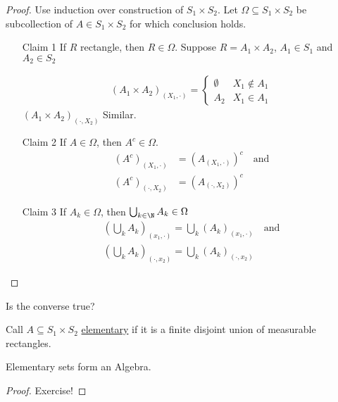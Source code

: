 \begin{proof}
	Use induction over construction of $S_1 \times S_2$.
	Let $\Omega \subseteq S_1 \times S_2$ be subcollection of $A \in S_1 \times S_2$ for which conclusion holds.

	 \begin{enumerate}
		 \item[Claim 1] If $R$ rectangle, then $R \in \Omega$. Suppose  $R = A_1 \times A_2$, $A_1 \in S_1$ and $A_2 \in S_2$

			 \begin{align*}
				 (A_1 \times A_2)_{(X_1, \cdot)} =
				 \begin{cases}
					 \emptyset & X_1 \notin A_1 \\
					 A_2 & X_1 \in A_1
				 \end{cases}
			 \end{align*} 
			 $(A_1 \times A_2)_{(\cdot, X_2)}$ Similar.
		 \item[Claim 2] If $A \in \Omega$, then  $A^c \in \Omega$.
			 \begin{align*}
				 (A^c)_{(X_1, \cdot)} &= (A_{(X_1, \cdot)})^c \quad \text{and} \\
				 (A^c)_{(\cdot, X_2)} &= (A_{(\cdot, X_2)})^c
			 \end{align*}

		 \item[Claim 3] If $A_k \in \Omega$, then  $\bigcup_{k \in \N} A_k \in \Omega$
			 \begin{align*}
				 (\bigcup_{k}A_k)_{(x_1, \cdot)} = \bigcup_{k}(A_k)_{(x_1, \cdot)} \quad \text{and} \\
				 (\bigcup_{k}A_k)_{(\cdot, x_2)} = \bigcup_{k}(A_k)_{(\cdot, x_2)}
			 \end{align*}
			 
	\end{enumerate}
\end{proof}

\begin{exercise}
	Is the converse true?
\end{exercise}

\begin{definition}
	Call $A \subseteq S_1 \times S_2$ \underline{elementary} if it is a finite disjoint union of measurable rectangles.
\end{definition}


\begin{lemma}
	Elementary sets form an Algebra.
\end{lemma}
\begin{proof}
	Exercise!
\end{proof}

